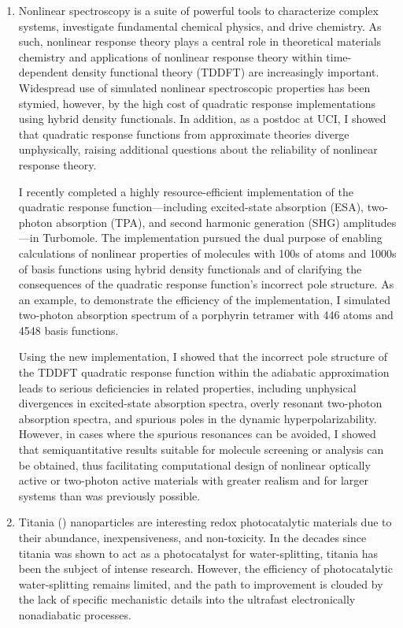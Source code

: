 \documentclass{nihbiosketch}
\begin{document}
\begin{enumerate}
  \item
  Nonlinear spectroscopy is a suite of powerful tools to characterize complex systems, investigate fundamental chemical
  physics, and drive chemistry. As such, nonlinear response theory plays a central role in theoretical
  materials chemistry and applications of nonlinear response theory within time-dependent density functional theory
  (TDDFT) are increasingly important. Widespread use of simulated nonlinear spectroscopic
  properties has been stymied, however, by the high cost of quadratic response implementations using hybrid density
  functionals.
  In addition, as a postdoc at UCI, I showed that quadratic response functions from approximate theories diverge
  unphysically,\cite{Parker:2016ke} raising additional questions about the reliability of nonlinear response theory.

  I recently completed a highly resource-efficient implementation of the quadratic response function---including excited-state
  absorption (ESA), two-photon absorption (TPA), and second harmonic generation (SHG) amplitudes---in Turbomole.\cite{Parker2017quad}
  The implementation pursued the dual purpose of enabling calculations of nonlinear
  properties of molecules with 100s of atoms and 1000s of basis functions using hybrid density functionals and of
  clarifying the consequences of the quadratic response function's incorrect pole structure.\cite{Parker:2016ke} As
  an example, to demonstrate the efficiency of the implementation, I simulated two-photon absorption spectrum of a 
  porphyrin tetramer with 446 atoms and 4548 basis functions.

  Using the new implementation, I showed that the incorrect pole structure of the TDDFT quadratic
  response function within the adiabatic approximation leads to serious deficiencies in related properties, including
  unphysical divergences in excited-state absorption spectra, overly resonant two-photon absorption spectra, and spurious
  poles in the dynamic hyperpolarizability. However, in cases where the spurious resonances can be avoided, I showed that
  semiquantitative results suitable for molecule screening or analysis can be obtained, thus facilitating computational
  design of nonlinear optically active or two-photon active materials with greater realism and for larger systems than was
  previously possible.

  \item
  Titania () nanoparticles are interesting redox photocatalytic materials due to their abundance,
  inexpensiveness, and non-toxicity. In the decades since titania was shown to act as a photocatalyst for water-splitting,
  titania has been the subject of intense research.\cite{Fujishima1972Nature} However, the efficiency of photocatalytic
  water-splitting remains limited, and the path to improvement is clouded by the lack of specific mechanistic details into
  the ultrafast electronically nonadiabatic processes.


\end{enumerate}
\end{document}
